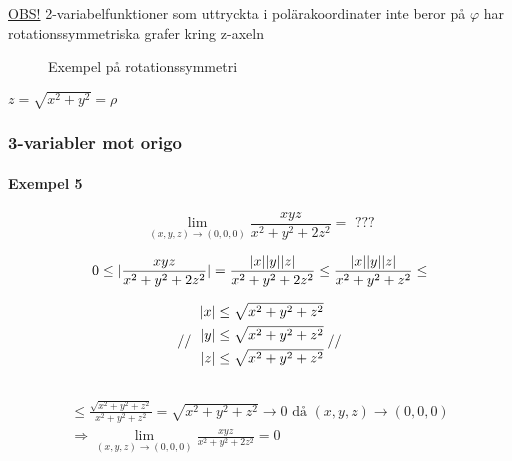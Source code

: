 \documentclass{article}
\DeclarePairedDelimiter \abs{\lvert}{\rvert}
\begin{document}
\underline{OBS!} 2-variabelfunktioner som uttryckta i polärakoordinater inte beror på $\varphi$ har rotationssymmetriska grafer kring z-axeln

\begin{figure}[ht]
\usetikzlibrary{3d}
\caption{Exempel på rotationssymmetri} \label{fig:3}
\end{figure}

\(
z = \sqrt{x^2+y^2} = \rho
\)

\subsubsection{3-variabler mot origo}
\paragraph{Exempel 5}

\begin{equation}
	\lim_{(x,y,z) \rightarrow (0,0,0)} \frac{xyz}{x^2+y^2+2z^2} = \text{ ???}
\end{equation}

\[
	0 \leq \abs{\frac{xyz}{x^2+y^2+2z^2}} = \frac{\abs{x}\abs{y}\abs{z}}{x^2+y^2+2z^2} \leq \frac{\abs{x}\abs{y}\abs{z}}{x^2+y^2+z^2} \leq 
\]

\[
	// 
	\def\arraystretch{1.1}
	\begin{blockarray}{r@{\;}l}
	\abs{x} \leq \sqrt{x^2+y^2+z^2} \\ [\jot]
	\abs{y} \leq \sqrt{x^2+y^2+z^2} \\ [\jot]
	\abs{z} \leq \sqrt{x^2+y^2+z^2}
	\end{blockarray}
	//
\]

\[
\begin{split}
	\leq \frac{\sqrt{x^2+y^2+z^2}}{x^2+y^2+z^2} = \sqrt{x^2+y^2+z^2} \rightarrow 0 \text{ då } (x,y,z) \rightarrow (0,0,0) \\
	\Rightarrow \lim_{(x,y,z) \rightarrow (0,0,0)} \frac{xyz}{x^2+y^2+2z^2} = 0
\end{split}
\]
\end{document}
